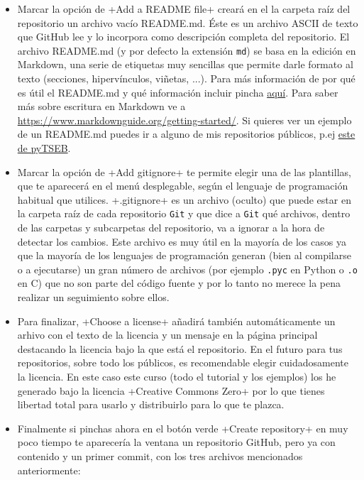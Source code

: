 \documentclass[a5paper,10pt]{article}
\begin{document}
       \begin{itemize}
        \item Marcar la opción de \cverb+Add a README file+ creará en el la carpeta raíz del repositorio un archivo vacío README.md. Éste es un archivo ASCII de texto que GitHub lee y lo incorpora como descripción completa del repositorio. El archivo README.md (y por defecto la extensión \verb+md+) se basa en la edición en Markdown, una serie de etiquetas muy sencillas que permite darle formato al texto (secciones, hipervínculos, viñetas, ...). Para más información de por qué es útil el README.md y qué información incluir pincha \href{https://github.com/18F/open-source-guide/blob/18f-pages/pages/making-readmes-readable.md}{aquí}. Para saber más sobre escritura en Markdown ve a \url{https://www.markdownguide.org/getting-started/}. Si quieres ver un ejemplo de un README.md puedes ir a alguno de mis repositorios públicos, p.ej \href{https://github.com/hectornieto/pyTSEB/blob/master/README.md}{este de pyTSEB}.
       
        \item Marcar la opción de \cverb+Add gitignore+ te permite elegir una de las plantillas, que te aparecerá en el menú desplegable, según el lenguaje de programación habitual que utilices. \cverb+.gitignore+ es un archivo (oculto) que puede estar en la carpeta raíz de cada repositorio \verb+Git+ y que dice a \verb+Git+ qué archivos, dentro de las carpetas y subcarpetas del repositorio, va a ignorar a la hora de detectar los cambios. Este archivo es muy útil en la mayoría de los casos ya que la mayoría de los lenguajes de programación generan (bien al compilarse o a ejecutarse) un gran número de archivos (por ejemplo \verb+.pyc+ en Python o \verb+.o+ en C) que no son parte del código fuente y por lo tanto no merece la pena realizar un seguimiento sobre ellos.
       
        \item Para finalizar, \cverb+Choose a license+  añadirá   también automáticamente un arhivo con el texto de la licencia y un mensaje en la página principal destacando la licencia bajo la que está el repositorio. En el futuro para tus repositorios, sobre todo los públicos, es recomendable elegir cuidadosamente la licencia. En este caso este curso (todo el tutorial y los ejemplos) los he generado bajo la licencia \cverb+Creative Commons Zero+ por lo que tienes libertad total para usarlo y distribuirlo para lo que te plazca.
       
        \item Finalmente si pinchas ahora en el botón verde \cverb+Create repository+ en muy poco tiempo te aparecería la ventana un repositorio GitHub, pero ya con contenido y un primer commit, con los tres archivos mencionados anteriormente:
       

\end{itemize}
\end{document}
